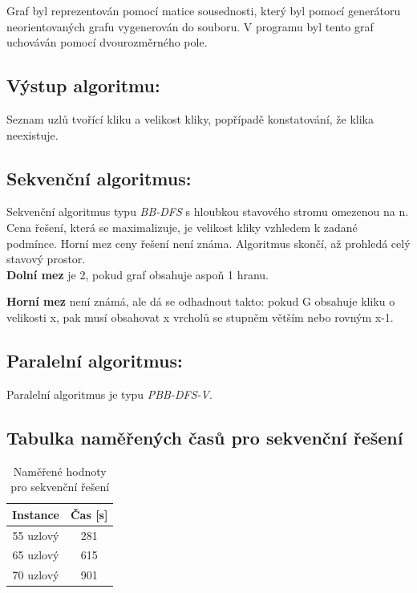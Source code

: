 \documentclass[11pt]{article}
\begin{document}
Graf byl reprezentován pomocí matice sousednosti, který byl pomocí generátoru neorientovaných grafu vygenerován do souboru. V programu byl tento graf uchováván pomocí dvourozměrného pole.

\subsection{Výstup algoritmu:}
Seznam uzlů tvořící kliku a velikost kliky, popřípadě konstatování, že klika neexistuje.

\subsection{Sekvenční algoritmus:}
Sekvenční algoritmus typu \textit{BB-DFS} s hloubkou stavového stromu omezenou na n. Cena řešení, která se maximalizuje, je velikost kliky vzhledem k zadané podmínce. Horní mez ceny řešení není známa. Algoritmus skončí, až prohledá celý stavový prostor. \\

\textbf{Dolní mez} je 2, pokud graf obsahuje aspoň 1 hranu.

\textbf{Horní mez} není známá, ale dá se odhadnout takto: pokud G obsahuje kliku o velikosti x, pak musí obsahovat x vrcholů se stupněm větším nebo rovným x-1.

\subsection{Paralelní algoritmus:}
Paralelní algoritmus je typu \textit{PBB-DFS-V}.

\subsection{Tabulka naměřených časů pro sekvenční řešení}
\begin{table}[h]
	\caption{Naměřené hodnoty pro sekvenční řešení}
	\label{tab:namereneHodnotySekvencni}
	\centering
	\begin{tabular}{| c | c |}
		\hline
		\textbf{Instance} & \textbf{Čas [s]} \\
		\hline \hline		
		55 uzlový & 281 \\
		\hline
		65 uzlový & 615 \\
		\hline
		70 uzlový & 901 \\
		\hline
	\end{tabular}
\end{table}

\end{document}
